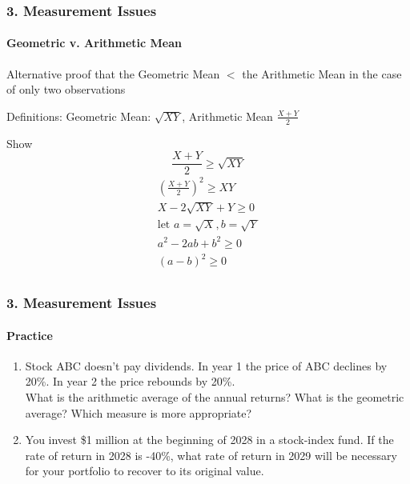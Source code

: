 \documentclass{beamer}
\begin{document}
\begin{frame}[t]
    \frametitle{3. Measurement Issues}
    \framesubtitle{Geometric v. Arithmetic Mean}

    \footnotesize

    Alternative proof that the Geometric Mean $<$ the Arithmetic Mean in the case of only two observations
    \vspace{1em}
    
    Definitions: Geometric Mean: $\sqrt{XY}$, Arithmetic Mean $\frac{X+Y}{2}$
    
    \vspace{1em}
    
    Show $$\frac{X+Y}{2} \geq \sqrt{XY}$$
    \begin{align*}
        \left(\frac{X+Y}{2}\right)^2 \geq XY \\
         X - 2\sqrt{XY} + Y \geq 0 \\
        \text{let } a = \sqrt{X}, b = \sqrt{Y} \\
        a^2 - 2ab + b^2 \geq 0 \\
        (a - b)^2 \geq 0 \\
    \end{align*}

\end{frame}

\begin{practiceframe}[t]
    \frametitle{3. Measurement Issues}
    \framesubtitle{Practice}

    \begin{enumerate}
    \item
    Stock ABC doesn't pay dividends.   In year 1 the price of ABC declines by 20\%.   
    In year 2 the price rebounds by 20\%.\\ 
    \vspace{1em} 
    What is the arithmetic average of the annual returns?   What is the geometric average?
    \vspace{1em}
    Which measure is more appropriate?
    \item   You invest \$1 million at the beginning of 2028 in a stock-index fund. 
    If the rate of return in 2028 is -40\%, what rate of return in 2029 will be necessary for your portfolio to recover to its original value.
    \end{enumerate}

\end{practiceframe}
\end{document}
